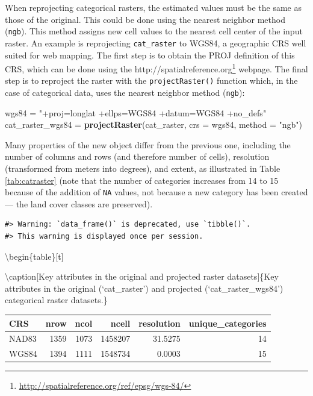 \documentclass[]{krantz}
\newenvironment{Shaded}{\begin{snugshade}}{\end{snugshade}}
\newcommand{\DataTypeTok}[1]{\textcolor[rgb]{0.27,0.27,0.27}{#1}}
\newcommand{\KeywordTok}[1]{\textcolor[rgb]{0.27,0.27,0.27}{\textbf{#1}}}
\newcommand{\NormalTok}[1]{#1}
\newcommand{\StringTok}[1]{\textcolor[rgb]{0.5,0.5,0.5}{#1}}
\let\rmarkdownfootnote\footnote%
\def\footnote{\protect\rmarkdownfootnote}
\renewcommand{\href}[2]{#2\footnote{\url{#1}}}
\begin{document}
When reprojecting categorical rasters, the estimated values must be the same as those of the original.
This could be done using the nearest neighbor method (\texttt{ngb}).
This method assigns new cell values to the nearest cell center of the input raster.
An example is reprojecting \texttt{cat\_raster} to WGS84, a geographic CRS well suited for web mapping.
The first step is to obtain the PROJ definition of this CRS, which can be done using the \href{http://spatialreference.org/ref/epsg/wgs-84/}{http://spatialreference.org} webpage.
The final step is to reproject the raster with the \texttt{projectRaster()} function which, in the case of categorical data, uses the nearest neighbor method (\texttt{ngb}):

\begin{Shaded}
\begin{Highlighting}[]
\NormalTok{wgs84 =}\StringTok{ "+proj=longlat +ellps=WGS84 +datum=WGS84 +no_defs"}
\NormalTok{cat_raster_wgs84 =}\StringTok{ }\KeywordTok{projectRaster}\NormalTok{(cat_raster, }\DataTypeTok{crs =}\NormalTok{ wgs84, }\DataTypeTok{method =} \StringTok{"ngb"}\NormalTok{)}
\end{Highlighting}
\end{Shaded}

Many properties of the new object differ from the previous one, including the number of columns and rows (and therefore number of cells), resolution (transformed from meters into degrees), and extent, as illustrated in Table \ref{tab:catraster} (note that the number of categories increases from 14 to 15 because of the addition of \texttt{NA} values, not because a new category has been created --- the land cover classes are preserved).

\begin{verbatim}
#> Warning: `data_frame()` is deprecated, use `tibble()`.
#> This warning is displayed once per session.
\end{verbatim}

\textbackslash{}begin\{table\}{[}t{]}

\textbackslash{}caption{[}Key attributes in the original and projected raster datasets{]}\{\label{tab:catraster}Key attributes in the original (`cat\_raster') and projected (`cat\_raster\_wgs84') categorical raster datasets.\}
\centering

\begin{tabular}{lrrrrr}
\toprule
CRS & nrow & ncol & ncell & resolution & unique\_categories\\
\midrule
NAD83 & 1359 & 1073 & 1458207 & 31.5275 & 14\\
WGS84 & 1394 & 1111 & 1548734 & 0.0003 & 15\\
\bottomrule
\end{tabular}
\end{document}
